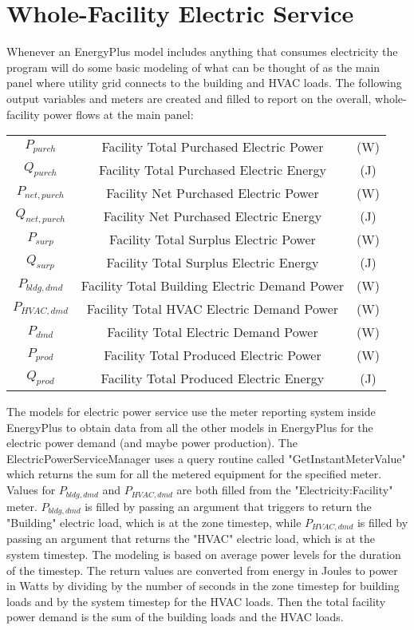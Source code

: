 \section{Whole-Facility Electric Service}\label{section-whole-facility-electric-service}

Whenever an EnergyPlus model includes anything that consumes electricity the program will do some basic modeling of what can be thought of as the main panel where utility grid connects to the building and HVAC loads.  The following output variables and meters are created and filled to report on the overall, whole-facility power flows at the main panel: 

\begin{tabular}{c|c|c}
  ${P_{purch}}$ &    Facility Total Purchased Electric Power & (W) \tabularnewline
  ${Q_{purch}}$ &    Facility Total Purchased Electric Energy & (J) \tabularnewline
  ${P_{net,purch}}$ &    Facility Net Purchased Electric Power & (W) \tabularnewline
  ${Q_{net,purch}}$ &    Facility Net Purchased Electric Energy & (J) \tabularnewline
  ${P_{surp}}$ &    Facility Total Surplus Electric Power & (W) \tabularnewline
  ${Q_{surp}}$ &    Facility Total Surplus Electric Energy & (J) \tabularnewline
  ${P_{bldg,dmd}}$ &    Facility Total Building Electric Demand Power & (W) \tabularnewline
  ${P_{HVAC,dmd}}$ &    Facility Total HVAC Electric Demand Power & (W) \tabularnewline
  ${P_{dmd}}$ &    Facility Total Electric Demand Power & (W) \tabularnewline
  ${P_{prod}}$ &    Facility Total Produced Electric Power & (W) \tabularnewline
  ${Q_{prod}}$ &   Facility Total Produced Electric Energy & (J)
\end{tabular}

The models for electric power service use the meter reporting system inside EnergyPlus to obtain data from all the other models in EnergyPlus for the electric power demand (and maybe power production).  The ElectricPowerServiceManager uses a query routine called "GetInstantMeterValue" which returns the sum for all the metered equipment for the specified meter.  Values for $P_{bldg,dmd}$ and $P_{HVAC,dmd}$ are both filled from the "Electricity:Facility" meter.  $P_{bldg,dmd}$ is filled by passing an argument that triggers to return the "Building" electric load, which is at the zone timestep, while $P_{HVAC,dmd}$ is filled by passing an argument that returns the "HVAC" electric load, which is at the system timestep.  The modeling is based on average power levels for the duration of the timestep. The return values are converted from energy in Joules to power in Watts by dividing by the number of seconds in the zone timestep for building loads and by the system timestep for the HVAC loads.  Then the total facility power demand is the sum of the building loads and the HVAC loads. 


